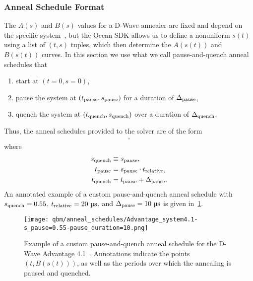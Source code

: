 \subsubsection{Anneal Schedule Format}
The \( A(s) \) and \( B(s) \) values for a D-Wave annealer are fixed and depend on the specific system~\cite{dwave_anneal_schedules}, but the Ocean SDK allows us to define a nonuniform \( s(t) \) using a list of \( (t, s) \) tuples, which then determine the \( A(s(t)) \) and \( B(s(t)) \) curves.
In this section we use what we call pause-and-quench anneal schedules that
\begin{enumerate}
    \item start at \( (t = 0, s = 0) \),
    \item pause the system at \( (t_{\text{pause}}, s_{\text{pause}}) \) for a duration of \( \Delta_{\text{pause}} \),
    \item quench the system at \( (t_{\text{quench}}, s_{\text{quench}}) \) over a duration of \( \Delta_{\text{quench}} \).
\end{enumerate}
Thus, the anneal schedules provided to the solver are of the form
\begin{align}
    [
        (0, 0),
        (\tpause, \spause),
        (\tquench, \squench),
        (\tquench + \Deltaquench, 1)
    ],
\end{align}
where
\begin{align}
\begin{split}
    s_{\text{quench}} &\equiv s_{\text{pause}}, \\
    t_{\text{pause}} &= s_{\text{pause}} \cdot t_{\text{relative}}, \\
    t_{\text{quench}} &= t_{\text{pause}} + \Delta_{\text{pause}}.
\end{split}
\end{align}
An annotated example of a custom pause-and-quench anneal schedule with \( s_{\text{quench}} = 0.55 \), \( t_{\text{relative}} = 20 \ \si{\micro\second} \), and \( \Deltapause = 10 \ \si{\micro\second} \) is given in~\cref{fig:anneal_schedule_annotated}.
\begin{figure}[!htb]
    \begin{center}
        \texttt{[image: qbm/anneal\_schedules/Advantage\_system4.1-s\_pause=0.55-pause\_duration=10.png]}
    \end{center}
    \caption{
        Example of a custom pause-and-quench anneal schedule for the D-Wave Advantage 4.1~\cite{dwave_anneal_schedules}.
        Annotations indicate the points \( (t, B(s(t))) \), as well as the periods over which the annealing is paused and quenched.
    }
    \label{fig:anneal_schedule_annotated}
\end{figure}

